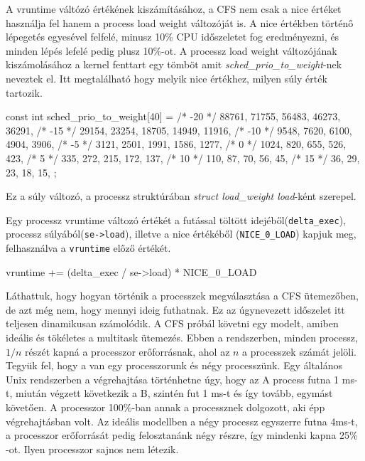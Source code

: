 A vruntime váltózó értékének kiszámításához, a CFS nem csak a nice értéket használja fel hanem a process load weight változóját is. A nice értékben történő lépegetés egyesével felfelé, minusz 10\% CPU időszeletet fog eredményezni, és minden lépés lefelé pedig plusz 10\%-ot. 
A processz load weight változójának kiszámolásához a kernel fenttart egy tömböt amit \textit{sched\_prio\_to\_weight}-nek neveztek el. Itt megtalálható hogy melyik nice értékhez, milyen súly érték tartozik.
\begin{cpp}
const int sched_prio_to_weight[40] = {
 /* -20 */     88761,     71755,     56483,     46273,     36291,
 /* -15 */     29154,     23254,     18705,     14949,     11916,
 /* -10 */      9548,      7620,      6100,      4904,      3906,
 /*  -5 */      3121,      2501,      1991,      1586,      1277,
 /*   0 */      1024,       820,       655,       526,       423,
 /*   5 */       335,       272,       215,       172,       137,
 /*  10 */       110,        87,        70,        56,        45,
 /*  15 */        36,        29,        23,        18,        15,
};
\end{cpp}


\noindent Ez a súly változó, a processz struktúrában \textit{struct load\_weight load}-ként szerepel.

Egy processz vruntime változó értékét a futással töltött idejéből(\texttt{delta\_exec}), processz súlyából(\texttt{se->load}), illetve a nice értékéből (\texttt{NICE\_0\_LOAD}) kapjuk meg, felhasználva a \texttt{vruntime} előző értékét.
\begin{cpp}
vruntime += (delta_exec / se->load) * NICE_0_LOAD
\end{cpp}

Láthattuk, hogy hogyan történik a processzek megválasztása a CFS ütemezőben, de azt még nem, hogy mennyi ideig futhatnak.
Ez az úgynevezett időszelet itt teljesen dinamikusan számolódik.
A CFS próbál követni egy modelt, amiben ideális és tökéletes a multitask ütemezés. Ebben a rendszerben, minden processz, $1/n$ részét kapná a processzor erőforrásnak, ahol az $n$ a processzek számát jelöli. 
Tegyük fel, hogy a van egy processzorunk és négy processzünk.
Egy általános Unix rendszerben a végrehajtása történhetne úgy, hogy az A process futna 1 ms-t, miután végzett következik a B, szintén fut 1 ms-t és így tovább, egymást követően. A processzor 100\%-ban annak a processznek dolgozott, aki épp végrehajtásban volt.
Az ideális modellben a négy processz egyszerre futna 4ms-t, a processzor erőforrását pedig felosztanánk négy részre, így mindenki kapna 25\% -ot. Ilyen processzor sajnos nem létezik.

